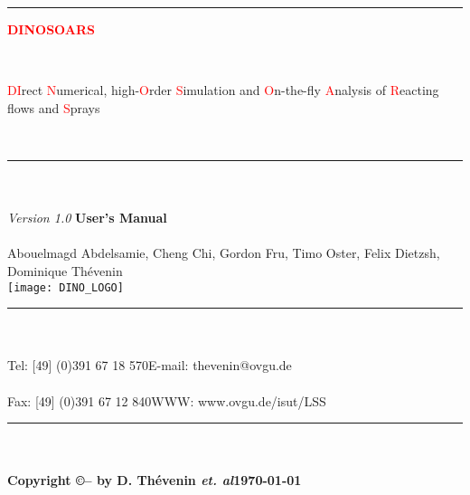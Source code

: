 \thispagestyle{empty}

%
{\noindent \rule{\textwidth}{2.0pt}}
{\noindent\fontsize{30}{32}\selectfont\par\vspace*{0.5cm}\textcolor{red}{\textbf{DINOSOARS}}}\\

{\noindent \fontsize{30}{32}\selectfont\par\vspace*{0.5cm}
\textcolor{red}{DI}rect \textcolor{red}{N}umerical,
high-\textcolor{red}{O}rder \textcolor{red}{S}imulation and \textcolor{red}{O}n-the-fly \textcolor{red}{A}nalysis of \textcolor{red}{R}eacting flows and \textcolor{red}{S}prays
}\\

%
{\noindent \rule{\textwidth}{2.0pt}}\\\\
%
\vspace*{0.5cm}
\emph{\color{blue} Version 1.0}
\vfill
%
{\noindent \Huge \textbf{User's Manual}}\\\\
{Abouelmagd Abdelsamie, Cheng Chi, Gordon Fru, Timo Oster, Felix Dietzsh, Dominique Th\'evenin }\\
%
\vspace{1.0cm}
\bc \texttt{[image: DINO\_LOGO]} \ec
\vfill
%
\noindent
{\noindent  \rule{\textwidth}{2.0pt}}\\\\
Tel: [49] (0)391 67 18 570\hfill E-mail: thevenin@ovgu.de\\\\
Fax: [49] (0)391 67 12 840\hfill WWW: www.ovgu.de/isut/LSS\\
{\noindent  \rule{\textwidth}{2.0pt}}\\\\
\vspace*{0.2cm}
\textbf{Copyright \copyright -- \the\year\quad by D. Th\'evenin {\it et. al}\hfill \today}

